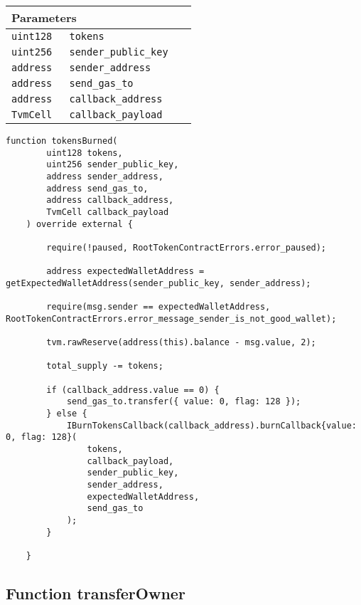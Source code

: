 \ifsoltables
\noindent\begin{tabular}{|l|l|p{5cm}|}\hline
\multicolumn{3}{|l|}{\bf Parameters}\\\hline
\tt uint128 & \tt tokens &\\\hline
\tt uint256 & \tt sender\_{}public\_{}key &\\\hline
\tt address & \tt sender\_{}address &\\\hline
\tt address & \tt send\_{}gas\_{}to &\\\hline
\tt address & \tt callback\_{}address &\\\hline
\tt TvmCell & \tt callback\_{}payload &\\\hline
\end{tabular}
\fi

\vspace{2cm}

\begin{lstlisting}[firstnumber=347]
    function tokensBurned(
        uint128 tokens,
        uint256 sender_public_key,
        address sender_address,
        address send_gas_to,
        address callback_address,
        TvmCell callback_payload
    ) override external {

        require(!paused, RootTokenContractErrors.error_paused);

        address expectedWalletAddress = getExpectedWalletAddress(sender_public_key, sender_address);

        require(msg.sender == expectedWalletAddress, RootTokenContractErrors.error_message_sender_is_not_good_wallet);

        tvm.rawReserve(address(this).balance - msg.value, 2);

        total_supply -= tokens;

        if (callback_address.value == 0) {
            send_gas_to.transfer({ value: 0, flag: 128 });
        } else {
            IBurnTokensCallback(callback_address).burnCallback{value: 0, flag: 128}(
                tokens,
                callback_payload,
                sender_public_key,
                sender_address,
                expectedWalletAddress,
                send_gas_to
            );
        }

    }
\end{lstlisting}

\subsection{Function transferOwner}


